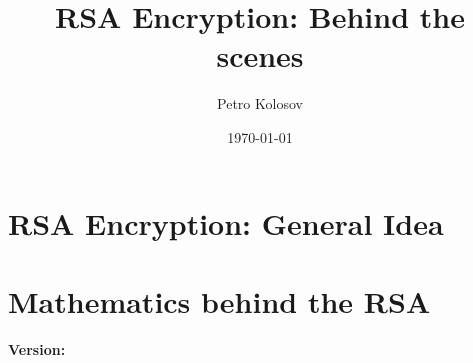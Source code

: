 \documentclass[12pt,letterpaper,oneside,reqno]{amsart}
\title[RSA Encryption: Behind the scenes]{RSA Encryption: Behind the scenes}
\author[Petro Kolosov]{Petro Kolosov}
\date{\today}
\numberwithin{equation}{section}
\begin{document}
    \begin{abstract}
        
    \end{abstract}


    \maketitle
    \tableofcontents


    \section{RSA Encryption: General Idea}\label{sec:rsa-encryption-algorithm}
    


    \section{Mathematics behind the RSA}\label{sec:mathematics-behind-rsa}
    

    
    
    \noindent \textbf{Version:} 
\end{document}
